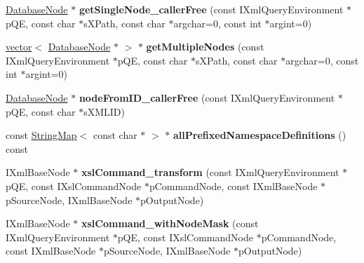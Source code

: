 \begin{DoxyCompactItemize}
\item 
\hypertarget{classgeneral__server_1_1Database_aa02ac9cecf8d5e82eb44400a01125185}{\hyperlink{classgeneral__server_1_1DatabaseNode}{\-Database\-Node} $\ast$ {\bfseries get\-Single\-Node\-\_\-caller\-Free} (const \-I\-Xml\-Query\-Environment $\ast$p\-Q\-E, const char $\ast$s\-X\-Path, const char $\ast$argchar=0, const int $\ast$argint=0)}\label{classgeneral__server_1_1Database_aa02ac9cecf8d5e82eb44400a01125185}

\item 
\hypertarget{classgeneral__server_1_1Database_a40ded77cfcf26fdcd4c4ad02efcd6787}{\hyperlink{classvector}{vector}$<$ \hyperlink{classgeneral__server_1_1DatabaseNode}{\-Database\-Node} $\ast$ $>$ $\ast$ {\bfseries get\-Multiple\-Nodes} (const \-I\-Xml\-Query\-Environment $\ast$p\-Q\-E, const char $\ast$s\-X\-Path, const char $\ast$argchar=0, const int $\ast$argint=0)}\label{classgeneral__server_1_1Database_a40ded77cfcf26fdcd4c4ad02efcd6787}

\item 
\hypertarget{classgeneral__server_1_1Database_afee8bb6eb16e6c5a8ef8eaf158f23c57}{\hyperlink{classgeneral__server_1_1DatabaseNode}{\-Database\-Node} $\ast$ {\bfseries node\-From\-I\-D\-\_\-caller\-Free} (const \-I\-Xml\-Query\-Environment $\ast$p\-Q\-E, const char $\ast$s\-X\-M\-L\-I\-D)}\label{classgeneral__server_1_1Database_afee8bb6eb16e6c5a8ef8eaf158f23c57}

\item 
\hypertarget{classgeneral__server_1_1Database_a96cd0033eb45626240ae31c4a52cb324}{const \hyperlink{classgeneral__server_1_1StringMap}{\-String\-Map}$<$ const char $\ast$ $>$ $\ast$ {\bfseries all\-Prefixed\-Namespace\-Definitions} () const }\label{classgeneral__server_1_1Database_a96cd0033eb45626240ae31c4a52cb324}

\item 
\hypertarget{group__XSLModule-Commands_gabb330e7c756bfe86efa3575d28423ea4}{\-I\-Xml\-Base\-Node $\ast$ {\bfseries xsl\-Command\-\_\-transform} (const \-I\-Xml\-Query\-Environment $\ast$p\-Q\-E, const \-I\-Xsl\-Command\-Node $\ast$p\-Command\-Node, const \-I\-Xml\-Base\-Node $\ast$p\-Source\-Node, \-I\-Xml\-Base\-Node $\ast$p\-Output\-Node)}\label{group__XSLModule-Commands_gabb330e7c756bfe86efa3575d28423ea4}

\item 
\hypertarget{group__XSLModule-Commands_gab2cb360c41c9c85c7ed41352e3316eb5}{\-I\-Xml\-Base\-Node $\ast$ {\bfseries xsl\-Command\-\_\-with\-Node\-Mask} (const \-I\-Xml\-Query\-Environment $\ast$p\-Q\-E, const \-I\-Xsl\-Command\-Node $\ast$p\-Command\-Node, const \-I\-Xml\-Base\-Node $\ast$p\-Source\-Node, \-I\-Xml\-Base\-Node $\ast$p\-Output\-Node)}\label{group__XSLModule-Commands_gab2cb360c41c9c85c7ed41352e3316eb5}


\end{DoxyCompactItemize}
